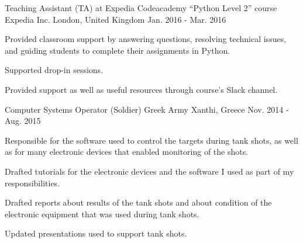 

\begin{cventries}

  \cventry
    {Teaching Assistant (TA) at Expedia Codeacademy ``Python Level 2'' course} %
    {Expedia Inc.} %
    {London, United Kingdom} %
    {Jan. 2016 - Mar. 2016} %
    {
      \begin{cvitems} %
        \item {Provided classroom support by answering questions, resolving technical issues, and guiding students to complete their assignments in Python.}
        \item {Supported drop-in sessions.}
        \item {Provided support as well as useful resources through course's Slack channel.}
      \end{cvitems}
    }
    
  \cventry
    {Computer Systems Operator (Soldier)} %
    {Greek Army} %
    {Xanthi, Greece} %
    {Nov. 2014 - Aug. 2015} %
    {
      \begin{cvitems} %
      	\item {Responsible for the software used to control the targets during tank shots, as well as for many electronic devices that enabled monitoring of the shots.}
      	\item {Drafted tutorials for the electronic devices and the software I used as part of my responsibilities.}
      	\item {Drafted reports about results of the tank shots and about condition of the electronic equipment that was used during tank shots.}
        \item {Updated presentations used to support tank shots.}
      \end{cvitems}
    }
    

\end{cventries}
